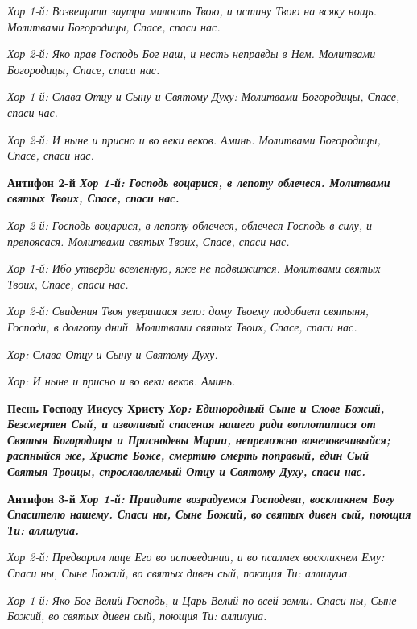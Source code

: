 \itshape Хор 1-й:\normalfont{} Возвещати заутра милость Твою, и истину Твою на всяку нощь. Молитвами Богородицы, Спасе, спаси нас.


\itshape Хор 2-й:\normalfont{} Яко прав Господь Бог наш, и несть неправды в Нем. Молитвами Богородицы, Спасе, спаси нас.


\itshape Хор 1-й:\normalfont{} Слава Отцу и Сыну и Святому Духу: Молитвами Богородицы, Спасе, спаси нас.


\itshape Хор 2-й:\normalfont{} И ныне и присно и во веки веков. Аминь. Молитвами Богородицы, Спасе, спаси нас.


\bfseries Антифон 2-й\normalfont{} \itshape Хор 1-й:\normalfont{} Господь воцарися, в лепоту облечеся. Молитвами святых Твоих, Спасе, спаси нас.


\itshape Хор 2-й:\normalfont{} Господь воцарися, в лепоту облечеся, облечеся Господь в силу, и препоясася. Молитвами святых Твоих, Спасе, спаси нас.


\itshape Хор 1-й:\normalfont{} Ибо утверди вселенную, яже не подвижится. Молитвами святых Твоих, Спасе, спаси нас.


\itshape Хор 2-й:\normalfont{} Свидения Твоя уверишася зело: дому Твоему подобает святыня, Господи, в долготу дний. Молитвами святых Твоих, Спасе, спаси нас.


\itshape Хор:\normalfont{} Слава Отцу и Сыну и Святому Духу.


\itshape Хор:\normalfont{} И ныне и присно и во веки веков. Аминь.


\bfseries Песнь Господу Иисусу Христу\normalfont{} \itshape Хор:\normalfont{} Единородный Сыне и Слове Божий, Безсмертен Сый, и изволивый спасения нашего ради воплотитися от Святыя Богородицы и Приснодевы Марии, непреложно вочеловечивыйся; распныйся же, Христе Боже, смертию смерть поправый, един Сый Святыя Троицы, спрославляемый Отцу и Святому Духу, спаси нас.


\bfseries Антифон 3-й\normalfont{} \itshape Хор 1-й:\normalfont{} Приидите возрадуемся Господеви, воскликнем Богу Спасителю нашему. Спаси ны, Сыне Божий, во святых дивен сый, поющия Ти: аллилуиа.


\itshape Хор 2-й:\normalfont{} Предварим лице Его во исповедании, и во псалмех воскликнем Ему: Спаси ны, Сыне Божий, во святых дивен сый, поющия Ти: аллилуиа.


\itshape Хор 1-й:\normalfont{} Яко Бог Велий Господь, и Царь Велий по всей земли. Спаси ны, Сыне Божий, во святых дивен сый, поющия Ти: аллилуиа.


